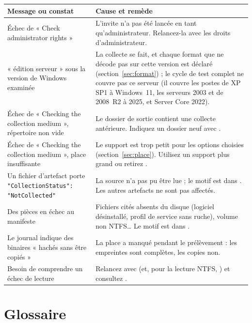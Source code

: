\documentclass[11pt,a4paper,oneside]{report}
\begin{document}
\begin{longtable}{@{}L{5cm}L{9.4cm}@{}}
\toprule
\bfseries Message ou constat & \bfseries Cause et remède \\
\midrule
\endhead
Échec de « Check administrator rights » & L'invite n'a pas été lancée en tant
  qu'administrateur. Relancez-la avec les droits d'administrateur. \\
« édition serveur » sous la version de Windows examinée & La collecte se
  fait, et chaque format que \wac{} ne décode pas sur cette version est déclaré
  (section~\ref{sec:format}) ; le cycle de test complet ne couvre pas ce
  serveur (il couvre les postes de XP SP1 à Windows~11, les serveurs 2003 et
  de 2008~R2 à 2025, et Server Core 2022). \\
Échec de « Checking the collection medium », répertoire non vide & Le dossier de
  sortie contient une collecte antérieure. Indiquez un dossier neuf avec
  . \\
Échec de « Checking the collection medium », place insuffisante & Le support
  est trop petit pour les options choisies (section~\ref{sec:place}). Utilisez un
  support plus grand ou retirez . \\
Un fichier d'artefact porte \texttt{"CollectionStatus": "NotCollected"} &
  La source n'a pas pu être lue ; le motif est dans . Les autres
  artefacts ne sont pas affectés. \\
Des pièces en échec au manifeste & Fichiers cités absents du disque (logiciel
  désinstallé, profil de service sans ruche), volume non NTFS\ldots{} Le motif est
  dans . \\
Le journal indique des binaires « hachés sans être copiés » & La place a manqué
  pendant le prélèvement : les empreintes sont complètes, les copies non. \\
Besoin de comprendre un échec de lecture & Relancez avec  (et, pour
  la lecture NTFS, ) et consultez . \\
\bottomrule
\end{longtable}

\appendix

\chapter{Glossaire}
\end{document}
